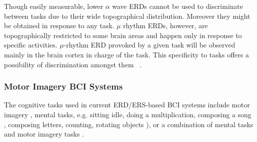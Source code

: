 Though easily measurable, lower $\alpha$ wave ERDs cannot be used to discriminate between tasks due to their wide topographical distribution. 
Moreover they might be obtained in response to any task. %
$\mu$ rhythm ERDs, however, are topographically restricted to some brain areas and happen only in response to specific activities. $\mu$-rhythm ERD provoked by a given task will be observed mainly in the brain cortex in charge of the task. 
This specificity to tasks offers a possibility of discrimination amongst them~ \citep{pfurtscheller_event-related_1999}.

\subsubsection{Motor Imagery BCI Systems}

The cognitive tasks used in current ERD/ERS-based BCI systems include motor imagery \citep{pfurtscheller_motor_2001}, mental tasks, e.g. sitting idle, doing a multiplication, composing a song \citep{kumar_design_2010}, composing letters, counting, rotating objects \citep{faradji_brain-computer_2009}), or a combination of mental tasks and motor imagery tasks \citep{penny_eeg-based_2000, ozmen_discrimination_2011}.%

